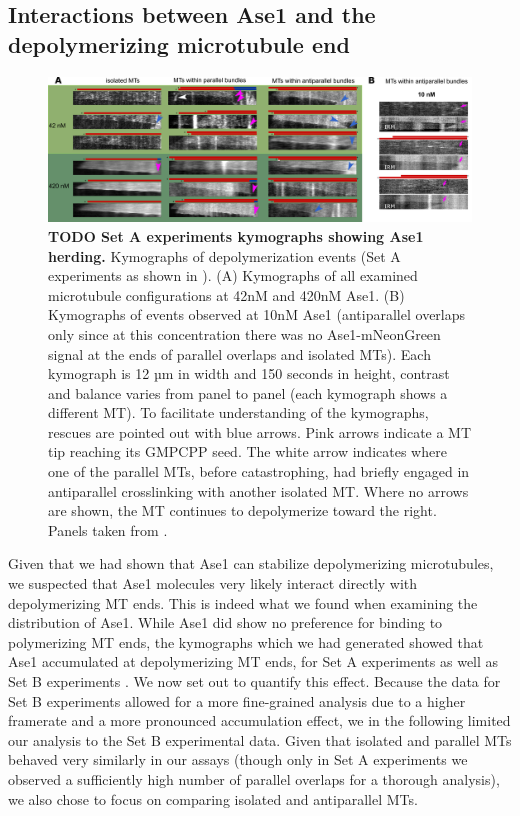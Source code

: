 \subsection{Interactions between Ase1 and the depolymerizing microtubule end}
\label{sec:ase12}
\begin{figure}[h]
    \centering
    \includegraphics[width=1\linewidth]{Figures/ase2a.png}
    \caption[TODO Set A experiments kymographs showing Ase1 herding.]{\textbf{TODO Set A experiments kymographs showing Ase1 herding.} Kymographs of depolymerization events (Set A experiments as shown in ). (A) Kymographs of all examined microtubule configurations at 42nM and 420nM Ase1. (B) Kymographs of events observed at 10nM Ase1 (antiparallel overlaps only since at this concentration there was no Ase1-mNeonGreen signal at the ends of parallel overlaps and isolated MTs). Each kymograph is 12 µm in width and 150 seconds in height, contrast and balance varies from panel to panel (each kymograph shows a different MT). To facilitate understanding of the kymographs, rescues are pointed out with blue arrows. Pink arrows indicate a MT tip reaching its GMPCPP seed. The white arrow indicates where one of the parallel MTs, before catastrophing, had briefly engaged in antiparallel crosslinking with another isolated MT. Where no arrows are shown, the MT continues to depolymerize toward the right. Panels taken from \cite{Krattenmacher2024}.
        }\label{ase2a}
\end{figure}
Given that we had shown that Ase1 can stabilize depolymerizing microtubules, we suspected that Ase1 molecules very likely interact directly with depolymerizing MT ends. This is indeed what we found when examining the distribution of Ase1. While Ase1 did show no preference for binding to polymerizing MT ends, the kymographs which we had generated showed that Ase1 accumulated at depolymerizing MT ends, for Set A experiments  as well as Set B experiments . We now set out to quantify this effect. Because the data for Set B experiments allowed for a more fine-grained analysis due to a higher framerate and a more pronounced accumulation effect, we in the following limited our analysis to the Set B experimental data. Given that isolated and parallel MTs behaved very similarly in our assays (though only in Set A experiments we observed a sufficiently high number of parallel overlaps for a thorough analysis), we also chose to focus on comparing isolated and antiparallel MTs.\par
